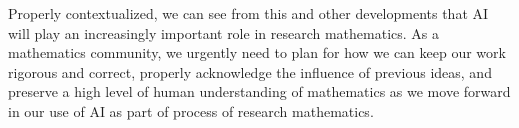 \documentclass[11pt,reqno]{amsart}
\numberwithin{equation}{section}
\theoremstyle{definition}
\theoremstyle{remark}
\begin{document}
Properly contextualized, we can see from this and other developments that AI will play an increasingly important role in research mathematics.   As a mathematics community, we urgently need to plan for how we can keep our work rigorous and correct, properly acknowledge the influence of previous ideas, and preserve a high level of human understanding of mathematics as we move forward in our use of AI as part of process of research mathematics.  




\end{document}
